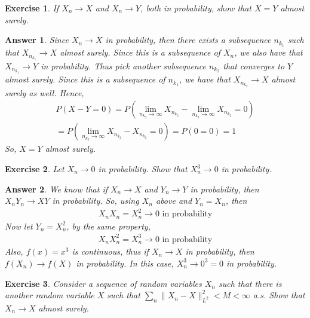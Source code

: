\documentclass[12pt]{article}
\theoremstyle{colon}
\newtheorem{exercise}{Exercise}
\newtheorem*{answer}{Answer}
\begin{document}
\clearpage

\begin{exercise}
  If $X_n \rightarrow X$ and $X_n \rightarrow Y$, both in probability, show that $X = Y$ almost surely.
\end{exercise}

\begin{answer}
  Since $X_n \rightarrow X$ in probability, then there exists a subsequence $n_{k_1}$ such that $X_{n_{k_1}} \rightarrow X$ almost surely. Since this is a subsequence of $X_n$, we also have that $X_{n_{k_1}} \rightarrow Y$ in probability. Thus pick another subsequence $n_{k_2}$ that converges to $Y$ almost surely. Since this is a subsequence of $n_{k_1}$, we have that $X_{n_{k_2}} \rightarrow X$ almost surely as well. Hence,
  \begin{gather*}
    P(X-Y = 0) = P(\lim_{n_{k_2} \rightarrow \infty} X_{n_{k_2}} - \lim_{n_{k_2} \rightarrow \infty} X_{n_{k_2}} = 0) \\
    = P(\lim_{n_{k_2} \rightarrow \infty} X_{n_{k_2}} - X_{n_{k_2}} = 0) = P(0 = 0) = 1
  \end{gather*}
  So, $X = Y$ almost surely.
\end{answer}

\clearpage

\begin{exercise}
  Let $X_n \rightarrow 0$ in probability. Show that $X_n^3 \rightarrow 0$ in probability.
\end{exercise}

\begin{answer}
  We know that if $X_n \rightarrow X$ and $Y_n \rightarrow Y$ in probability, then $X_n Y_n \rightarrow XY$ in probability. So, using $X_n$ above and $Y_n = X_n$, then
  \begin{gather*}
    X_n X_n = X_n^2 \rightarrow 0 \text{ in probability}
  \end{gather*}
  Now let $Y_n = X_n^2$, by the same property,
  \begin{gather*}
    X_n X_n^2 = X_n^3 \rightarrow 0 \text{ in probability}
  \end{gather*}
  Also, $f(x) = x^3$ is continuous, thus if $X_n \rightarrow X$ in probability, then $f(X_n) \rightarrow f(X)$ in probability. In this case, $X_n^3 \rightarrow 0^3 = 0$ in probability.
\end{answer}

\clearpage

\begin{exercise}
  Consider a sequence of random variables $X_n$ such that there is another random variable $X$ such that $\sum_n \lVert X_n - X \rVert_{L^2}^2 < M < \infty$ a.s. Show that $X_n \rightarrow X$ almost surely.
\end{exercise}
\end{document}
